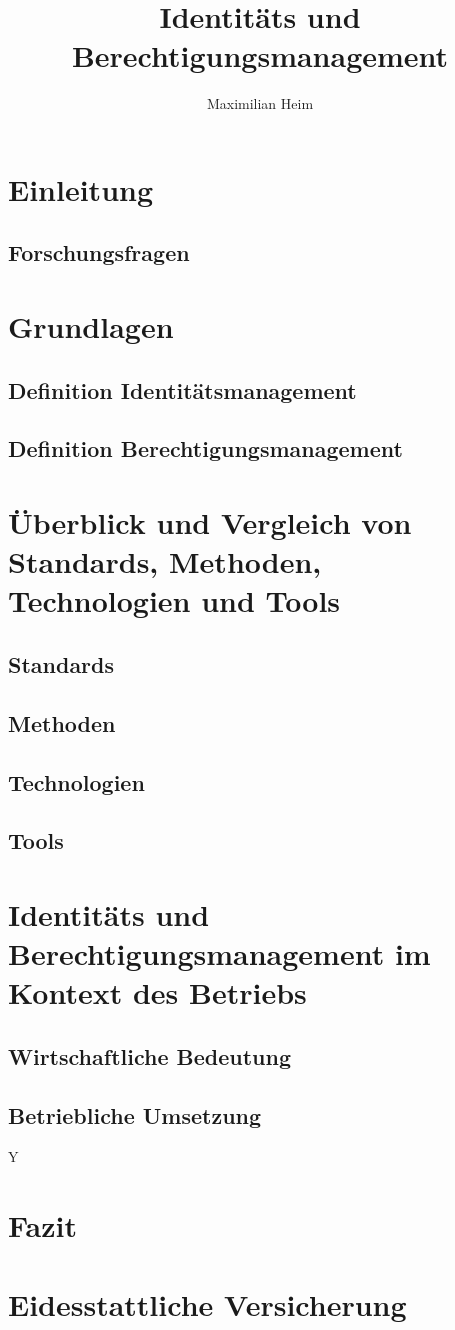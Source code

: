 \documentclass[10pt]{article}
\author{Maximilian Heim}
\title{Identitäts und Berechtigungsmanagement}
\begin{document}
\maketitle
\newpage
\tableofcontents
\newpage
\section{Einleitung}
\subsection{Forschungsfragen}
\section{Grundlagen}
\subsection{Definition Identitätsmanagement}
\subsection{Definition Berechtigungsmanagement}
\section{Überblick und Vergleich von Standards, Methoden, Technologien und Tools}
\subsection{Standards}
\subsection{Methoden}
\subsection{Technologien}
\subsection{Tools}
\section{Identitäts und Berechtigungsmanagement im Kontext des Betriebs}
\subsection{Wirtschaftliche Bedeutung}
\subsection{Betriebliche Umsetzung}Y
\section{Fazit}
\section{Eidesstattliche Versicherung}
\end{document}
